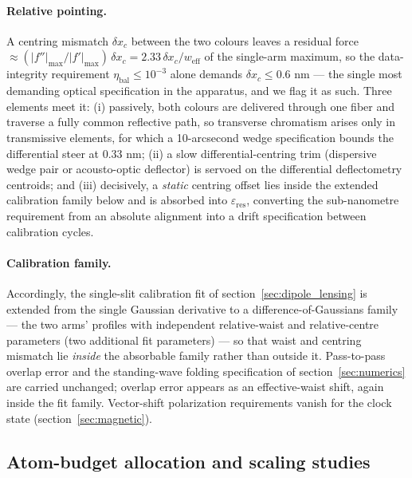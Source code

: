 \documentclass[11pt,a4paper]{article}
\begin{document}
\paragraph{Relative pointing.} A centring mismatch $\delta x_c$ between the two colours leaves a residual force $\approx (|f''|_\text{max}/|f'|_\text{max})\,\delta x_c = 2.33\,\delta x_c/w_\text{eff}$ of the single-arm maximum, so the data-integrity requirement $\eta_\text{bal} \leq 10^{-3}$ alone demands $\delta x_c \leq 0.6$ nm --- the single most demanding optical specification in the apparatus, and we flag it as such. Three elements meet it: (i) passively, both colours are delivered through one fiber and traverse a fully common reflective path, so transverse chromatism arises only in transmissive elements, for which a 10-arcsecond wedge specification bounds the differential steer at $0.33$ nm; (ii) a slow differential-centring trim (dispersive wedge pair or acousto-optic deflector) is servoed on the differential deflectometry centroids; and (iii) decisively, a \emph{static} centring offset lies inside the extended calibration family below and is absorbed into $\varepsilon_\text{res}$, converting the sub-nanometre requirement from an absolute alignment into a drift specification between calibration cycles.

\paragraph{Calibration family.} Accordingly, the single-slit calibration fit of section~\ref{sec:dipole_lensing} is extended from the single Gaussian derivative to a difference-of-Gaussians family --- the two arms' profiles with independent relative-waist and relative-centre parameters (two additional fit parameters) --- so that waist and centring mismatch lie \emph{inside} the absorbable family rather than outside it. Pass-to-pass overlap error and the standing-wave folding specification of section~\ref{sec:numerics} are carried unchanged; overlap error appears as an effective-waist shift, again inside the fit family. Vector-shift polarization requirements vanish for the clock state (section~\ref{sec:magnetic}).

\subsection{Atom-budget allocation and scaling studies}
\label{app:budgets_allocation}
\end{document}
